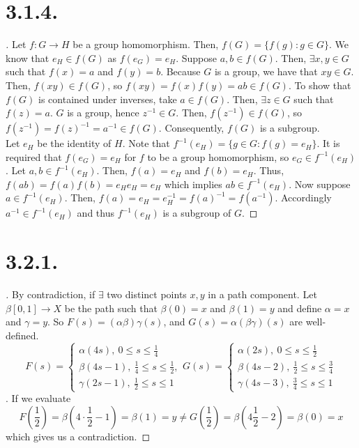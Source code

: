 \documentclass{article}
\begin{document}
\section*{3.1.4.}
\begin{proof}[\unskip\nopunct]
    Let $f: G \to H$ be a group homomorphism. Then, $f(G) = \{f(g) : g \in  G\}$. We know that $e_H \in f(G)$ as $f(e_G) = e_H$. 
    Suppose $a, b \in f(G)$. Then, $\exists x, y \in G$ such that $f(x) = a$ and $f(y) = b$. Because $G$ is a group, we have that $xy \in G$. 
    Then, $f(xy) \in f(G)$, so $f(xy) = f(x)f(y) = ab \in f(G)$. 
    To show that $f(G)$ is contained under inverses, take $a \in f(G)$. 
    Then, $\exists z \in G$ such that $f(z) = a$. $G$ is a group, hence $z^{-1} \in G$. Then, $f(z^{-1}) \in f(G)$, so $f(z^{-1}) = f(z)^{-1} = a^{-1} \in f(G)$. Consequently, $f(G)$ is a subgroup. \\
    Let $e_H$ be the identity of $H$. Note that $f^{-1}(e_H) = \{g \in G : f(g) = e_H\}$. It is required that $f(e_G) = e_H$ for $f$ to be a group homomorphism, so $e_G \in f^{-1}(e_H)$. Let $a, b \in f^{-1}(e_H)$. Then, $f(a) = e_H$ and $f(b) = e_H$. Thus, $f(ab) = f(a)f(b) = e_He_H = e_H$ which implies $ab \in f^{-1}(e_H)$. 
    Now suppose $a \in f^{-1}(e_H)$. Then, $f(a) = e_H = e_H^{-1} = f(a)^{-1} = f(a^{-1})$. Accordingly $a^{-1} \in f^{-1}(e_H)$ and thus $f^{-1}(e_H)$ is a subgroup of $G$. 

    
\end{proof}

\section*{3.2.1.}
\begin{proof}[\unskip\nopunct]
    By contradiction, if $\exists $ two distinct points $x, y$ in a path component. Let $\beta[0, 1] \to X$ be the path such that $\beta(0) = x$ and $\beta(1) = y$ and define $\alpha = x$ and $\gamma = y$. So $F(s) = (\alpha \beta) \gamma(s)$, and $G(s) = \alpha (\beta \gamma)(s)$ are well-defined. \[F(s) = \begin{cases}
        \alpha (4s) , \ 0 \leq s \leq \frac{1}{4} \\
        \beta(4s - 1), \  \frac{1}{4} \leq s \leq \frac{1}{2}, \\
        \gamma(2s - 1) , \ \frac{1}{2} \leq s \leq 1
    \end{cases} G(s) = \begin{cases}
        \alpha(2s), \ 0 \leq s \leq \frac{1}{2} \\
        \beta(4s - 2), \ \frac{1}{2} \leq s \leq \frac{3}{4} \\
        \gamma(4s - 3), \ \frac{3}{4} \leq s \leq 1
    \end{cases}\]. If we evaluate \[F\left(\frac{1}{2} \right) = \beta \left(4 \cdot \frac{1}{2} - 1\right) = \beta(1) = y \neq G\left(\frac{1}{2}\right) = \beta \left(4 \frac{1}{2} - 2 \right) = \beta(0) = x\]
    which gives us a contradiction.  
\end{proof}
\end{document}
